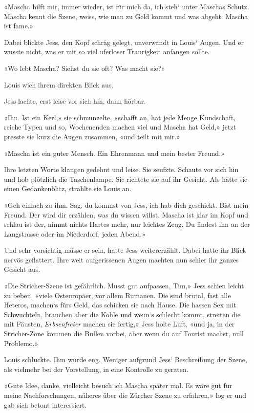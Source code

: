 «Mascha hilft mir, immer wieder, ist für mich da, ich steh` unter
Maschas Schutz. Mascha kennt die Szene, weiss, wie man zu Geld kommt und
was abgeht. Mascha ist fame.»

Dabei blickte Jess, den Kopf schräg gelegt, unverwandt in Louis` Augen.
Und er wusste nicht, was er mit so viel uferloser Traurigkeit anfangen
sollte.

«Wo lebt Mascha? Siehst du sie oft? Was macht sie?»

Louis wich ihrem direkten Blick aus.

Jess lachte, erst leise vor sich hin, dann hörbar.

«Ihn. Ist ein Kerl,» sie schmunzelte, «schafft an, hat jede Menge
Kundschaft, reiche Typen und so, Wochenenden machen viel und Mascha hat
Geld,» jetzt presste sie kurz die Augen zusammen, «und teilt mit mir.»

«Mascha ist ein guter Mensch. Ein Ehrenmann und mein bester Freund.»

Ihre letzten Worte klangen gedehnt und leise. Sie seufzte. Schaute vor
sich hin und hob plötzlich die Taschenlampe. Sie richtete sie auf ihr
Gesicht. Als hätte sie einen Gedankenblitz, strahlte sie Louis an.

«Geh einfach zu ihm. Sag, du kommst von Jess, ich hab dich geschickt.
Bist mein Freund. Der wird dir erzählen, was du wissen willst. Mascha
ist klar im Kopf und schlau ist der, nimmt nichts Hartes mehr, nur
leichtes Zeug. Du findest ihn an der Langstrasse oder im Niederdorf,
jeden Abend.»

Und sehr vorsichtig müsse er sein, hatte Jess weitererzählt. Dabei hatte
ihr Blick nervös geflattert. Ihre weit aufgerissenen Augen machten nun
schier ihr ganzes Gesicht aus.

«Die Stricher-Szene ist gefährlich. Musst gut aufpassen, Tim,» Jess
schien leicht zu beben, «viele Osteuropäer, vor allem Rumänen. Die sind
brutal, fast alle Heteros, machen`s fürs Geld, das schicken sie nach
Hause. Die hassen Sex mit Schwuchteln, brauchen aber die Kohle und
wenn`s schlecht kommt, streiten die mit Fäusten, \emph{Erbsenfreier}
machen sie fertig,» Jess holte Luft, «und ja, in der Stricher-Zone
kommen die Bullen vorbei, aber wenn du auf Tourist machst, null
Problemo.»

Louis schluckte. Ihm wurde eng. Weniger aufgrund Jess` Beschreibung der
Szene, als vielmehr bei der Vorstellung, in eine Kontrolle zu geraten.

«Gute Idee, danke, vielleicht besuch ich Mascha später mal. Es wäre gut
für meine Nachforschungen, näheres über die Zürcher Szene zu erfahren,»
log er und gab sich betont interessiert.

